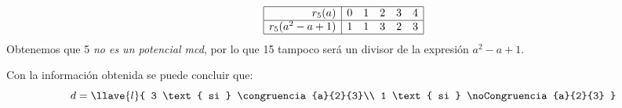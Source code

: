$$
  \begin{array}{|r|ccccc|}
    \hline
    r_5(a)           & 0 & 1 & 2 & 3 & 4 \\ \hline
    r_5(a^2 - a + 1) & 1 & 1 & 3 & 2 & 3 \\ \hline
  \end{array}
$$
Obtenemos que 5 \textit{no es un potencial mcd}, por lo que 15 tampoco será un divisor de la expresión  $a^2 - a + 1$.

Con la información obtenida se puede concluir que:
$$
d = 
\llave{l}{
        3 \text{ si } \congruencia{a}{2}{3}\\ 
        1 \text{ si } \noCongruencia{a}{2}{3}
}
$$

\begin{aportes}
  \item {}
  \item {}

\end{aportes}
